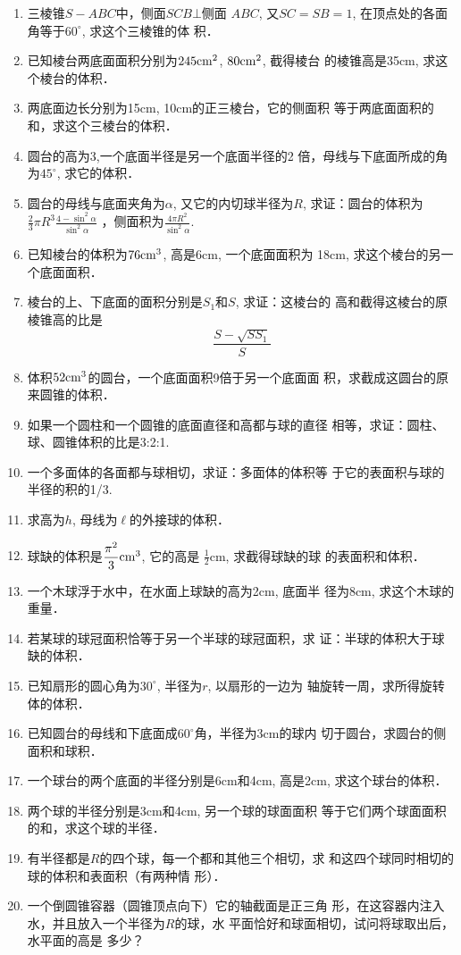 \begin{enumerate}
\item 三棱锥$S-ABC$中，侧面$SCB\bot$侧面 $ABC$, 又$SC=SB
=1$, 在顶点处的各面角等于$60^{\circ}$, 求这个三棱锥的体
积．
\item 已知棱台两底面面积分别为$245{\rm cm^2}$, $80{\rm cm^2}$, 截得棱台
的棱锥高是35cm, 求这个棱台的体积．
\item 两底面边长分别为15cm, 10cm的正三棱台，它的侧面积
等于两底面面积的和，求这个三棱台的体积．
\item 圆台的高为3,一个底面半径是另一个底面半径的2
倍，母线与下底面所成的角为$45^{\circ}$, 求它的体积．
\item 圆台的母线与底面夹角为$\alpha$, 又它的内切球半径为$R$, 
求证：圆台的体积为$\frac{2}{3}\pi R^3\frac{4-\sin^2\alpha}{\sin^2\alpha}$
，侧面积为$\frac{4\pi R^2}{\sin^2\alpha}$.
\item 已知棱台的体积为$76{\rm cm^3}$, 高是6cm, 一个底面面积为
18cm, 求这个棱台的另一个底面面积．
\item 棱台的上、下底面的面积分别是$S_1$和$S$, 求证：这棱台的
高和截得这棱台的原棱锥高的比是
\[\frac{S-\sqrt{SS_1}}{S}\]
\item 体积$52{\rm cm^3}$的圆台，一个底面面积9倍于另一个底面面
积，求截成这圆台的原来圆锥的体积．
\item 如果一个圆柱和一个圆锥的底面直径和高都与球的直径
相等，求证：圆柱、球、圆锥体积的比是3:2:1.
\item 一个多面体的各面都与球相切，求证：多面体的体积等
于它的表面积与球的半径的积的1/3.
\item 求高为$h$, 母线为$\ell$的外接球的体积．
\item 球缺的体积是$\frac{\pi^2}{3}{\rm cm^3}$, 它的高是
$\frac{1}{2}$cm, 求截得球缺的球
的表面积和体积．
\item 一个木球浮于水中，在水面上球缺的高为2cm, 底面半
径为8cm, 求这个木球的重量．
\item 若某球的球冠面积恰等于另一个半球的球冠面积，求
证：半球的体积大于球缺的体积．
\item 已知扇形的圆心角为$30^{\circ}$, 半径为$r$, 以扇形的一边为
轴旋转一周，求所得旋转体的体积．
\item 已知圆台的母线和下底面成$60^{\circ}$角，半径为3cm的球内
切于圆台，求圆台的侧面积和球积．
\item 一个球台的两个底面的半径分别是6cm和4cm, 高是2cm, 
求这个球台的体积．
\item 两个球的半径分别是3cm和4cm, 另一个球的球面面积
等于它们两个球面面积的和，求这个球的半径．
\item 有半径都是$R$的四个球，每一个都和其他三个相切，求
和这四个球同时相切的球的体积和表面积（有两种情
形）．
\item 一个倒圆锥容器（圆锥顶点向下）它的轴截面是正三角
形，在这容器内注入水，并且放入一个半径为$R$的球，水
平面恰好和球面相切，试问将球取出后，水平面的高是
多少？
\end{enumerate}


